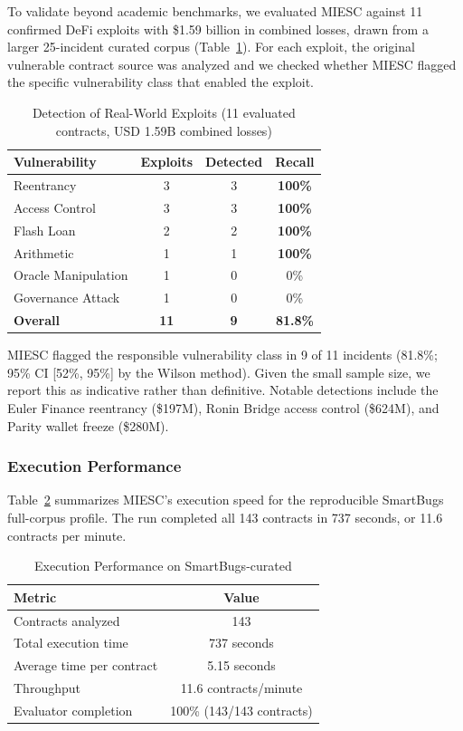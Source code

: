 \documentclass[conference]{IEEEtran}
\begin{document}
To validate beyond academic benchmarks, we evaluated MIESC against 11 confirmed DeFi exploits with \$1.59 billion in combined losses, drawn from a larger 25-incident curated corpus (Table~\ref{tab:exploits}). For each exploit, the original vulnerable contract source was analyzed and we checked whether MIESC flagged the specific vulnerability class that enabled the exploit.

\begin{table}[htbp]
\caption{Detection of Real-World Exploits (11 evaluated contracts, USD 1.59B combined losses)}
\label{tab:exploits}
\centering
\begin{tabular}{@{}lccc@{}}
\toprule
\textbf{Vulnerability} & \textbf{Exploits} & \textbf{Detected} & \textbf{Recall} \\
\midrule
Reentrancy & 3 & 3 & \textbf{100\%} \\
Access Control & 3 & 3 & \textbf{100\%} \\
Flash Loan & 2 & 2 & \textbf{100\%} \\
Arithmetic & 1 & 1 & \textbf{100\%} \\
Oracle Manipulation & 1 & 0 & 0\% \\
Governance Attack & 1 & 0 & 0\% \\
\midrule
\textbf{Overall} & \textbf{11} & \textbf{9} & \textbf{81.8\%} \\
\bottomrule
\end{tabular}
\end{table}

MIESC flagged the responsible vulnerability class in 9 of 11 incidents (81.8\%; 95\% CI [52\%, 95\%] by the Wilson method). Given the small sample size, we report this as indicative rather than definitive. Notable detections include the Euler Finance reentrancy (\$197M), Ronin Bridge access control (\$624M), and Parity wallet freeze (\$280M).

\subsubsection{Execution Performance}

Table~\ref{tab:performance} summarizes MIESC's execution speed for the reproducible SmartBugs full-corpus profile. The run completed all 143 contracts in 737 seconds, or 11.6 contracts per minute.

\begin{table}[htbp]
\caption{Execution Performance on SmartBugs-curated}
\label{tab:performance}
\centering
\begin{tabular}{@{}lc@{}}
\toprule
\textbf{Metric} & \textbf{Value} \\
\midrule
Contracts analyzed & 143 \\
Total execution time & 737 seconds \\
Average time per contract & 5.15 seconds \\
Throughput & 11.6 contracts/minute \\
Evaluator completion & 100\% (143/143 contracts) \\
\bottomrule
\end{tabular}
\end{table}
\end{document}
